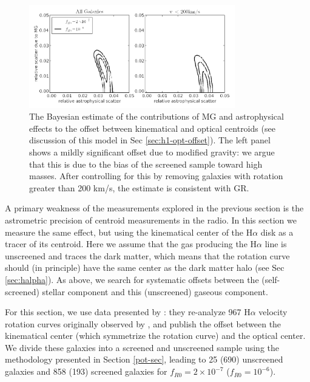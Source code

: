 \documentclass[twocolappendix, numberedappendix]{emulateapj}
\newcommand{\ha}{H$\alpha$}
\begin{document}
\begin{figure}
\begin{center}
  \includegraphics[width=0.8\textwidth]{figures/sec4_2_offset.png}
  \caption{The Bayesian estimate of the contributions of MG and astrophysical
effects to the offset between kinematical and optical centroids
(see discussion of this model in Sec \ref{sec:h1-opt-offset}).  The left
    panel shows a mildly significant offset due to modified gravity:
    we argue that this is due to the bias of the screened sample toward
    high masses.  After controlling for this by removing galaxies
    with rotation greater than 200 km/s, the estimate is
    consistent with GR. 
    }
  \label{offset-kin-den-2}
\end{center}
\end{figure}

A primary weakness of the measurements explored in the previous section is
the astrometric precision of centroid measurements in the radio.  In
this section we measure the same effect, but using the kinematical
center of the \ha{} disk as a tracer of its centroid.  Here we assume that
the gas producing the \ha{} line is unscreened and traces the dark matter,
which means that the rotation curve should (in principle) have the same
center as the dark matter halo (see Sec \ref{sec:halpha}).
As above, we search for systematic offsets
between the (self-screened) stellar component and this (unscreened) gaseous
component.

For this section, we use data presented by \citet{persic1995}:
they re-analyze 967 \ha{} velocity rotation curves originally 
observed by \citet{mat92}, and publish the offset between the kinematical
center (which symmetrize the rotation curve) and the optical center.  We divide these galaxies into a screened
and unscreened sample using the methodology presented in Section \ref{pot-sec},
leading to 25 (690) unscreened galaxies and 858 (193) screened galaxies
for $f_{R0} = 2 \times 10^{-7}$ ($f_{R0} = 10^{-6}$).
\end{document}
